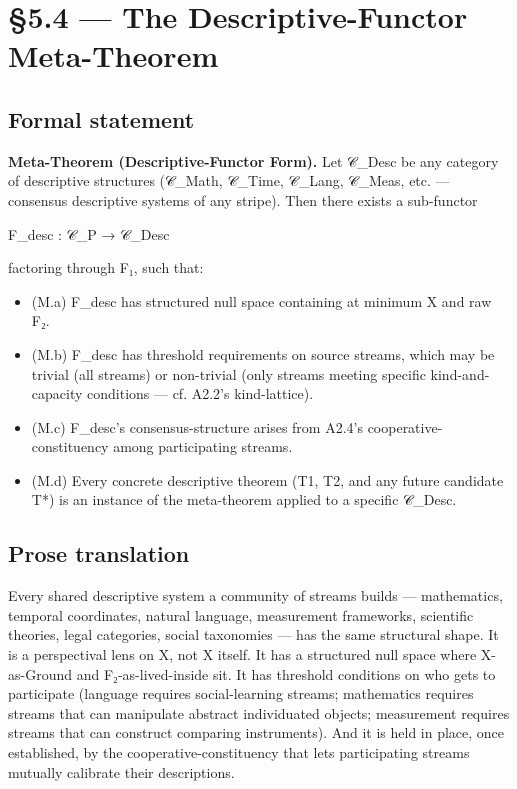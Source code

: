 \documentclass[11pt, openany]{book}
\newcommand{\sectionbreak}{\clearpage}
\begin{document}
\sectionbreak

\section{§5.4 --- The Descriptive-Functor Meta-Theorem}

\subsection{Formal statement}

\textbf{Meta-Theorem (Descriptive-Functor Form).} Let 𝒞\_\allowbreak{}Desc be any category of descriptive structures (𝒞\_\allowbreak{}Math, 𝒞\_\allowbreak{}Time, 𝒞\_\allowbreak{}Lang, 𝒞\_\allowbreak{}Meas, etc. --- consensus descriptive systems of any stripe). Then there exists a sub-functor

\begin{Code}
F_desc : 𝒞_P → 𝒞_Desc
\end{Code}

factoring through F₁, such that:

\begin{itemize}
\item (M.a) F\_\allowbreak{}desc has structured null space containing at minimum X and raw F₂.
\item (M.b) F\_\allowbreak{}desc has threshold requirements on source streams, which may be trivial (all streams) or non-trivial (only streams meeting specific kind-and-capacity conditions --- cf. A2.2's kind-lattice).
\item (M.c) F\_\allowbreak{}desc's consensus-structure arises from A2.4's cooperative-constituency among participating streams.
\item (M.d) Every concrete descriptive theorem (T1, T2, and any future candidate T*) is an instance of the meta-theorem applied to a specific 𝒞\_\allowbreak{}Desc.
\end{itemize}

\subsection{Prose translation}

Every shared descriptive system a community of streams builds --- mathematics, temporal coordinates, natural language, measurement frameworks, scientific theories, legal categories, social taxonomies --- has the same structural shape. It is a perspectival lens on X, not X itself. It has a structured null space where X-as-Ground and F₂-as-lived-inside sit. It has threshold conditions on who gets to participate (language requires social-learning streams; mathematics requires streams that can manipulate abstract individuated objects; measurement requires streams that can construct comparing instruments). And it is held in place, once established, by the cooperative-constituency that lets participating streams mutually calibrate their descriptions.
\end{document}
